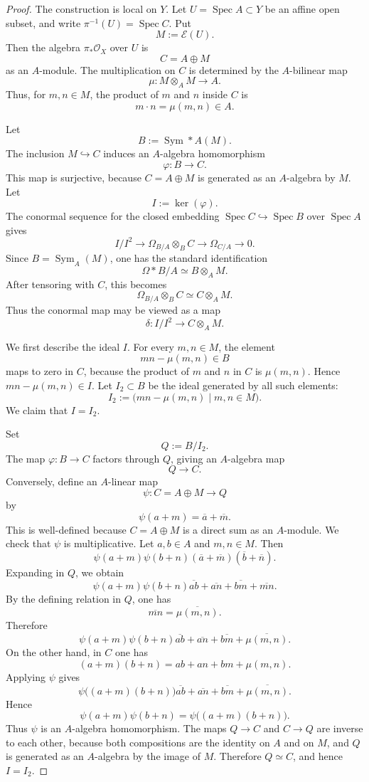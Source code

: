 \documentclass[11pt,twoside]{amsart}
\theoremstyle{plain}
\numberwithin{equation}{section}
\theoremstyle{definition}
\begin{document}
\begin{proof}
The construction is local on $Y$. Let $U=\operatorname{Spec}A\subset Y$ be an affine open subset, and write $\pi^{-1}(U)=\operatorname{Spec}C$. Put
$$
M:=\mathcal{E}(U).
$$
Then the algebra $\pi_*\mathcal{O}_X$ over $U$ is
$$
C=A\oplus M
$$
as an $A$-module. The multiplication on $C$ is determined by the $A$-bilinear map
$$
\mu:M\otimes_A M\longrightarrow A.
$$
Thus, for $m,n\in M$, the product of $m$ and $n$ inside $C$ is
$$
m\cdot n=\mu(m,n)\in A.
$$

Let
$$
B:=\operatorname{Sym}*A(M).
$$
The inclusion $M\hookrightarrow C$ induces an $A$-algebra homomorphism
$$
\varphi:B\longrightarrow C.
$$
This map is surjective, because $C=A\oplus M$ is generated as an $A$-algebra by $M$. Let
$$
I:=\ker(\varphi).
$$
The conormal sequence for the closed embedding $\operatorname{Spec}C\hookrightarrow\operatorname{Spec}B$ over $\operatorname{Spec}A$ gives
$$
I/I^2
\longrightarrow
\Omega_{B/A}\otimes_B C
\longrightarrow
\Omega_{C/A}
\longrightarrow 0.
$$
Since $B=\operatorname{Sym}_A(M)$, one has the standard identification
$$
\Omega*{B/A}\simeq B\otimes_A M.
$$
After tensoring with $C$, this becomes
$$
\Omega_{B/A}\otimes_B C\simeq C\otimes_A M.
$$
Thus the conormal map may be viewed as a map
$$
\delta:I/I^2\longrightarrow C\otimes_A M.
$$

We first describe the ideal $I$. For every $m,n\in M$, the element
$$
mn-\mu(m,n)\in B
$$
maps to zero in $C$, because the product of $m$ and $n$ in $C$ is $\mu(m,n)$. Hence $mn-\mu(m,n)\in I$. Let $I_2\subset B$ be the ideal generated by all such elements:
$$
I_2:=\bigl(mn-\mu(m,n)\mid m,n\in M\bigr).
$$
We claim that $I=I_2$.

Set
$$
Q:=B/I_2.
$$
The map $\varphi:B\to C$ factors through $Q$, giving an $A$-algebra map
$$
Q\longrightarrow C.
$$
Conversely, define an $A$-linear map
$$
\psi:C=A\oplus M\longrightarrow Q
$$
by
$$
\psi(a+m)=\overline{a}+\overline{m}.
$$
This is well-defined because $C=A\oplus M$ is a direct sum as an $A$-module. We check that $\psi$ is multiplicative. Let $a,b\in A$ and $m,n\in M$. Then
$$
\psi(a+m)\psi(b+n)
(\overline{a}+\overline{m})(\overline{b}+\overline{n}).
$$
Expanding in $Q$, we obtain
$$
\psi(a+m)\psi(b+n)
\overline{ab}+\overline{an}+\overline{bm}+\overline{mn}.
$$
By the defining relation in $Q$, one has
$$
\overline{mn}=\overline{\mu(m,n)}.
$$
Therefore
$$
\psi(a+m)\psi(b+n)
\overline{ab}+\overline{an}+\overline{bm}+\overline{\mu(m,n)}.
$$
On the other hand, in $C$ one has
$$
(a+m)(b+n)=ab+an+bm+\mu(m,n).
$$
Applying $\psi$ gives
$$
\psi\bigl((a+m)(b+n)\bigr)
\overline{ab}+\overline{an}+\overline{bm}+\overline{\mu(m,n)}.
$$
Hence
$$
\psi(a+m)\psi(b+n)=\psi\bigl((a+m)(b+n)\bigr).
$$
Thus $\psi$ is an $A$-algebra homomorphism. The maps $Q\to C$ and $C\to Q$ are inverse to each other, because both compositions are the identity on $A$ and on $M$, and $Q$ is generated as an $A$-algebra by the image of $M$. Therefore $Q\simeq C$, and hence $I=I_2$.


\end{proof}
\end{document}
